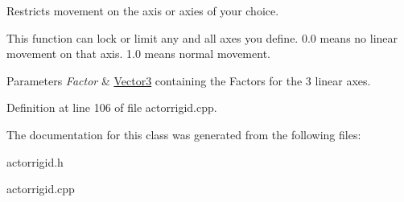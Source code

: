 Restricts movement on the axis or axies of your choice. 

This function can lock or limit any and all axes you define. 0.0 means no linear movement on that axis. 1.0 means normal movement. 
\begin{DoxyParams}{Parameters}
{\em Factor} & \hyperlink{classMezzanine_1_1Vector3}{Vector3} containing the Factors for the 3 linear axes. \\
\hline
\end{DoxyParams}


Definition at line 106 of file actorrigid.cpp.



The documentation for this class was generated from the following files:\begin{DoxyCompactItemize}
\item 
actorrigid.h\item 
actorrigid.cpp\end{DoxyCompactItemize}
